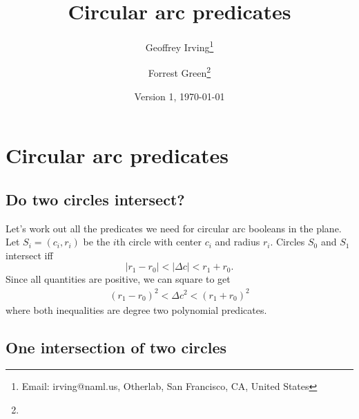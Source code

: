 \documentclass[11pt]{article}
\title{Circular arc predicates}
\author{Geoffrey Irving\thanks{Email: irving@naml.us, Otherlab, San Francisco, CA, United States}
\and Forrest Green\thanks{\TODO}}
\date{Version 1, \today}
\begin{document}
\maketitle

\section{Circular arc predicates}

\subsection{Do two circles intersect?}

Let's work out all the predicates we need for circular arc booleans in the plane.  Let $S_i = (c_i,r_i)$ be the $i$th
circle with center $c_i$ and radius $r_i$.  Circles $S_0$ and $S_1$ intersect iff
$$ | r_1 - r_0 | < |\Delta c| < r_1 + r_0. $$
Since all quantities are positive, we can square to get
\begin{align} \label{two-circles}
(r_1 - r_0)^2 < \Delta c^2 < (r_1 + r_0)^2
\end{align}
where both inequalities are degree two polynomial predicates.

\subsection{One intersection of two circles}
\end{document}
